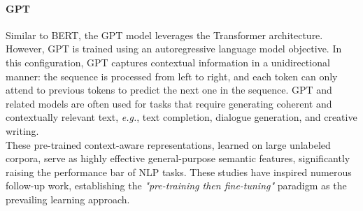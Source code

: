 
\paragraph{GPT} Similar to \ac{BERT}, the \ac{GPT} model \citep{radford2018improving} leverages the Transformer architecture. However, \ac{GPT} is trained using an autoregressive language model objective. In this configuration, \ac{GPT} captures contextual information in a unidirectional manner: the sequence is processed from left to right, and each token can only attend to previous tokens to predict the next one in the sequence. \ac{GPT} and related models \citep{radford2019language, brown2020language, ouyang2022training} are often used for tasks that require generating coherent and contextually relevant text, \textit{e.g.}, text completion, dialogue generation, and creative writing. \\

These pre-trained context-aware representations, learned on large unlabeled corpora, serve as highly effective general-purpose semantic features, significantly raising the performance bar of \ac{NLP} tasks. These studies have inspired numerous follow-up work, establishing the \textit{"pre-training then fine-tuning"} paradigm as the prevailing learning approach. 



\acresetall


